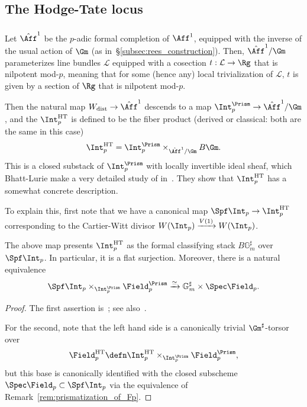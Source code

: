 \documentclass[10pt]{amsart}
\begin{document}
\subsection{The Hodge-Tate locus}
\label{subsec:hodge-tate_locus}

\subsubsection{}
Let $\hat{\Aff}^1$ be the $p$-adic formal completion of $\Aff^1$, equipped with the inverse of the usual action of $\Gm$ (as in~\S\ref{subsec:rees_construction}). Then, $\hat{\Aff}^1/\Gm$ parameterizes line bundles $\mathcal{L}$ equipped with a cosection $t:\mathcal{L}\to \Rg$ that is nilpotent mod-$p$, meaning that for some (hence any) local trivialization of $\mathcal{L}$, $t$ is given by a section of $\Rg$ that is nilpotent mod-$p$.

Then the natural map $W_{\mathrm{dist}}\to \hat{\Aff}^1$ descends to a map $\Int_p^\Prism\to \hat{\Aff}^1/\Gm$, and the  $\Int_p^{\mathrm{HT}}$ is defined to be the fiber product (derived or classical: both are the same in this case)
\[
\Int_p^{\mathrm{HT}} = \Int_p^{\Prism}\times_{\hat{\Aff}^1/\Gm}B\Gm.
\]
This is a closed substack of $\Int_p^{\Prism}$ with locally invertible ideal sheaf, which Bhatt-Lurie make a very detailed study of in~\cite[\S 3.4]{bhatt2022absolute}. They show that $\Int_p^{\mathrm{HT}}$ has a somewhat concrete description.

To explain this, first note that we have a canonical map $\Spf \Int_p\to \Int_p^{\mathrm{HT}}$ corresponding to the Cartier-Witt divisor $W(\Int_p)\xrightarrow{V(1)}W(\Int_p)$.
\begin{proposition}
\label{prop:hodge_tate_locus}
The above map  presents $\Int_p^{\mathrm{HT}}$ as the formal classifying stack $B\mathbb{G}_m^\sharp$ over $\Spf \Int_p$. In particular, it is a flat surjection. Moreover, there is a natural equivalence
\[
\Spf \Int_p\times_{\Int_p^{\Prism}}\Field_p^{\Prism}\xrightarrow{\simeq}\mathbb{G}_m^\sharp\times \Spec \Field_p.
\]

\end{proposition}
\begin{proof}
The first assertion is~\cite[Theorem 3.4.13]{bhatt2022absolute}; see also~\cite[Lemma 4.5.2]{drinfeld2022prismatization}. 

For the second, note that the left hand side is a canonically trivial $\Gm^\sharp$-torsor over 
\[
\Field_p^{\mathrm{HT}}\defn \Int_p^{\mathrm{HT}}\times_{\Int_p^{\Prism}}\Field_p^{\Prism},
\]
but this base is canonically identified with the closed subscheme $\Spec\Field_p\subset\Spf \Int_p$ via the equivalence of Remark~\ref{rem:prismatization_of_Fp}.
\end{proof}
\end{document}

